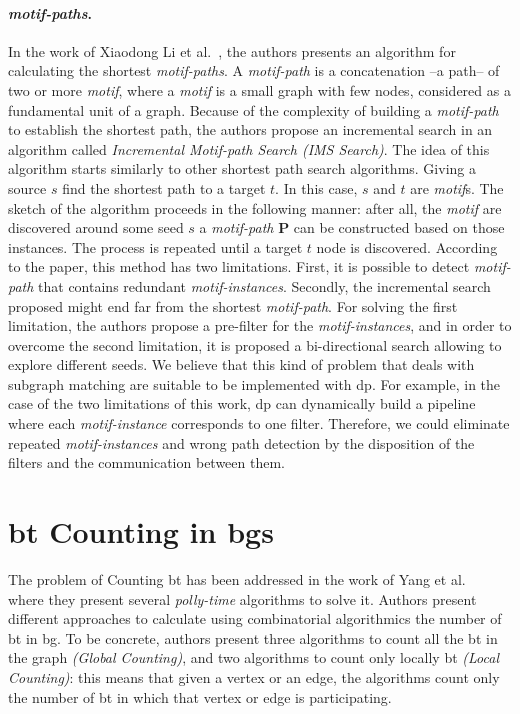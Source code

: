 \paragraph{\emph{motif-paths}.} In the work of Xiaodong Li et al.~\cite{Li2019MotifPA}, the authors presents an algorithm for calculating the shortest \emph{motif-paths}.
A \emph{motif-path} is a concatenation --a path--  of two or more \emph{motif}, where a \emph{motif} is a small graph with few nodes, considered as a fundamental unit of a graph.
Because of the complexity of building a \emph{motif-path} to establish the shortest path, the authors propose an incremental search in an algorithm called \emph{Incremental Motif-path Search (IMS Search)}.
The idea of this algorithm starts similarly to other shortest path search algorithms. Giving a source $s$ find the shortest path to a target $t$. In this case, $s$ and $t$ are \emph{motif}s.
The sketch of the algorithm proceeds in the following manner: after all, the \emph{motif} are discovered around some seed $s$ a \emph{motif-path} $\mathbf{P}$ can be constructed based on those instances.
The process is repeated until a target $t$ node is discovered. According to the paper, this method has two limitations. First, it is possible to detect \emph{motif-path} that contains 
redundant \emph{motif-instances}. Secondly, the incremental search proposed might end far from the shortest \emph{motif-path}. For solving the first limitation, the authors propose a pre-filter for the \emph{motif-instances},
and in order to overcome the second limitation, it is proposed a bi-directional search allowing to explore different seeds. 
We believe that this kind of problem that deals with subgraph matching are suitable to be implemented with \acrlong{dp}. 
For example, in the case of the two limitations of this work, \acrshort{dp} can dynamically build a pipeline where each \emph{motif-instance} corresponds to one filter. 
Therefore, we could eliminate repeated \emph{motif-instances} and wrong path detection by the disposition of the filters and the communication between them.

\section{\acrlong{bt} Counting in \acrlong{bg}s}\label{sec:rel-work:counting}
The problem of Counting \acrshort{bt} has been addressed in the work of Yang et al.~\cite{btcount} where they present several \emph{polly-time} algorithms to solve it.
Authors present different approaches to calculate using  combinatorial algorithmics the number of \acrshort{bt} in \acrshort{bg}. 
To be concrete, authors present three algorithms to count all the \acrshort{bt} in the graph \emph{(Global Counting)}, and two algorithms to count only locally \acrshort{bt} \emph{(Local Counting)}: this means that given a vertex or an edge, the algorithms count only the number of \acrshort{bt} in which 
that vertex or edge is participating.

